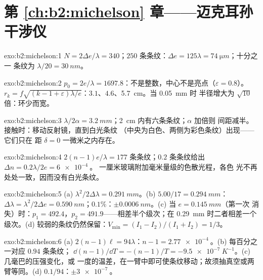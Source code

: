 \section*{第 \ref{ch:b2:michelson} 章——迈克耳孙干涉仪}

\begin{solution}{exo:b2:michelson:1}
$N = 2\Delta e/\lambda = 340$；$250$ 条条纹：$\Delta e = 125\lambda = \qty{74}{\micro m}$；十分之一
条纹为 $\lambda/20 = \qty{30}{nm}$。
\end{solution}

\begin{solution}{exo:b2:michelson:2}
$p_0 = 2e/\lambda = 1697.8$：不是整数，中心不是亮点（$\varepsilon =
0.8$）。$r_k = f\sqrt{(k - 1 + \varepsilon)\lambda/e}$：$3.1$、$4.6$、\qty{5.7}{cm}。当 \qty{0.05}{mm} 时
半径增大为 $\sqrt{10}$ 倍：环少而宽。
\end{solution}

\begin{solution}{exo:b2:michelson:3}
$\lambda/2\alpha = \qty{3.2}{mm}$；\qty{2}{cm} 内有六条条纹；$\alpha$ 加倍则
间距减半。接触时：移动反射镜，直到白光条纹
（中央为白色、两侧为彩色条纹）出现——它们只在
距 $\delta = 0$ 一微米之内存在。
\end{solution}

\begin{solution}{exo:b2:michelson:4}
$2(n - 1)e/\lambda = 177$ 条条纹；$0.2$ 条条纹给出 $\Delta n = 0.2\lambda/2e = \qty{6e-4}{}$。
一厘米玻璃附加毫米量级的色散光程，各色
光不再处处一致，因而没有白光条纹。
\end{solution}

\begin{solution}{exo:b2:michelson:5}
(a) $\lambda^2/2\Delta\lambda = \qty{0.291}{mm}$。(b) $5.00/17 = \qty{0.294}{mm}$：$\Delta\lambda = \lambda^2/2\Delta e =
\qty{0.590}{nm}$；$0.1\%$：$\pm\qty{0.0006}{nm}$。(c) 当 $e = \qty{0.145}{mm}$（第一次
消失）时：$p_1 = 492.4$，$p_2 = 491.9$——相差半个级次；在
\qty{0.29}{mm} 时二者相差一个级次。(d) 较弱的条纹仍然保留：$V_{\min} =
(I_1 - I_2)/(I_1 + I_2) = 1/3$。
\end{solution}

\begin{solution}{exo:b2:michelson:6}
(a) $2(n - 1)\ell = 94\lambda$：$n - 1 = \qty{2.77e-4}{}$。(b) 每百分之一对应 $0.94$ 条条纹；
$\dd(n - 1)/\dd T = -(n - 1)/T = \qty{-9.5e-7}{K^{-1}}$。(c) 几毫巴的压强变化，或
一度的温差，在一臂中即可使条纹移动；故须抽真空或两臂等同。(d)
$0.1/94$：$\pm\qty{3e-7}{}$。
\end{solution}

